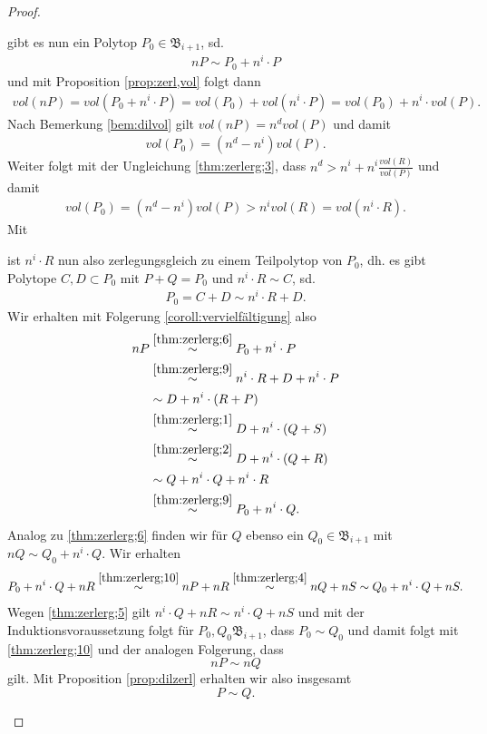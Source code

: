 \documentclass[11pt,titlepage]{article}
\theoremstyle{definition}
\theoremstyle{remark}
\begin{document}
\begin{proof}
\begin{itemize}
			gibt es nun ein Polytop $P_0\in\mathfrak{B}_{i+1}$, sd.
			\begin{align}
			nP\sim P_0 +n^i\cdot P \label{thm:zerlerg;6}
			\end{align}
			und mit Proposition \ref{prop:zerl,vol} folgt dann
			\begin{align*}
			vol(nP)=vol(P_0+n^i\cdot P)=vol(P_0)+vol(n^i\cdot P)=vol(P_0)+
			n^i\cdot vol(P).
			\end{align*}
			Nach Bemerkung \ref{bem:dilvol} gilt $vol(nP)=n^d vol(P)$ und damit 
			\begin{align}
			vol(P_0)=(n^d -n^i)vol(P). \label{thm:zerlerg;7}
			\end{align}
			Weiter folgt mit der Ungleichung \ref{thm:zerlerg;3}, dass 
			$n^d > n^i+n^i\frac{vol(R)}{vol(P)}$ und damit
			\begin{align}
				vol(P_0)=(n^d -n^i)vol(P)>n^i vol(R)=vol(n^i\cdot R)\label{thm:zerlerg;8}.
			\end{align}
			Mit
			
			
			ist $n^i\cdot R$ nun also zerlegungsgleich zu einem Teilpolytop von $P_0$, dh. es gibt Polytope $C,D\subset P_0$ mit $P+Q=P_0$ und $n^i\cdot R\sim C$, sd. 
			\begin{align}
			P_0=C+D\sim n^i\cdot R+D. \label{thm:zerlerg;9}
			\end{align}
			Wir erhalten mit Folgerung \ref{coroll:vervielfältigung} also
			\begin{align}
			nP &\overset{\ref{thm:zerlerg;6}}{\sim} P_0+n^i \cdot P \notag\\
			&\overset{\ref{thm:zerlerg;9}}{\sim} n^i\cdot R +D+n^i \cdot P \notag\\
			&\sim D+n^i\cdot(R+P) \notag\\ 
			&\overset{\ref{thm:zerlerg;1}}{\sim} D+n^i\cdot(Q+S) \notag\\
			&\overset{\ref{thm:zerlerg;2}}{\sim} D+n^i\cdot(Q+R) \notag\\
			&\sim Q+n^i\cdot Q +n^i\cdot R \notag\\
			&\overset{\ref{thm:zerlerg;9}}{\sim} P_0+n^i \cdot Q. \label{thm:zerlerg;10}
			\end{align}
			Analog zu \ref{thm:zerlerg;6} finden wir für $Q$ ebenso ein 
			$Q_0\in\mathfrak{B}_{i+1}$ mit $nQ\sim Q_0+n^i\cdot Q$. Wir erhalten 
			\[P_0+n^i\cdot Q+nR\overset{\ref{thm:zerlerg;10}}{\sim}
			nP+nR\overset{\ref{thm:zerlerg;4}}{\sim}nQ+nS\sim Q_0+n^i\cdot Q+nS.\]
			Wegen \ref{thm:zerlerg;5} gilt $n^i\cdot Q+nR\sim n^i\cdot Q +nS$ und 
			mit der Induktionsvoraussetzung folgt für $P_0,Q_0\mathfrak{B}_{i+1}
			$, dass 
			$P_0\sim Q_0$ und damit folgt mit \ref{thm:zerlerg;10} und der 
			analogen Folgerung, dass 
			\[nP\sim nQ\]
			gilt. Mit Proposition \ref{prop:dilzerl} erhalten wir also insgesamt 
			\[P\sim Q.\]
		\end{itemize}
	\end{proof}
	
\end{document}
